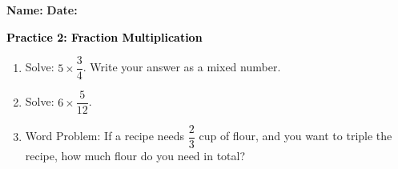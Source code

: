 \documentclass[12pt, letterpaper, fleqn]{article}
\begin{document}
\textbf{Name:} \underline{\hspace{5cm}}
\hfill
\textbf{Date:} \underline{\hspace{3cm}}\\

\begin{tcolorbox}[colback=customteal!20]
    \large\textcolor{black}{\textbf{Practice 2: Fraction Multiplication}}
\end{tcolorbox}
\begin{enumerate}[itemsep=3.5cm, leftmargin=0.6cm]
\item Solve: $5 \times \dfrac{3}{4}$. Write your answer as a mixed number.
\vspace{3.5cm}
\item Solve: $6 \times \dfrac{5}{12}$.
\vspace{3.5cm}
\item Word Problem: If a recipe needs $\dfrac{2}{3}$ cup of flour, and you want to triple the recipe, how much flour do you need in total?
\end{enumerate}
\end{document}
